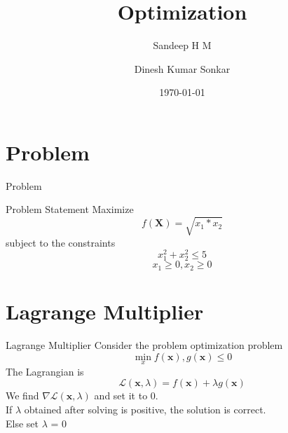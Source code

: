\documentclass{beamer}
\title{Optimization}
\author{Sandeep H M \and Dinesh Kumar Sonkar}
\date{\today}
\begin{document}
\begin{frame}
  \titlepage
\end{frame}

\section{Problem}
\begin{frame}{Problem}
\begin{block}{Problem Statement}
Maximize
\begin{equation*}
    f(\textbf{X}) = \sqrt{x_{1}*x_{2}}
\end{equation*}
subject to the constraints\\
\begin{equation*}
x_{1}^{2} + x_{2}^{2} \leq 5
\end{equation*}
\begin{equation*}
x_{1}\geq 0,x_{2}\geq 0
\end{equation*}
\end{block}

\begin{figure}
\centering
    \qquad
    \label{fig:example}
\end{figure}
\end{frame}

\section{Lagrange Multiplier} 
\begin{frame}{Lagrange Multiplier}
Consider the problem optimization problem
\begin{equation*}
    \min_{x} f(\textbf{x}), g(\textbf{x})\leq 0
\end{equation*}
The Lagrangian is 
\begin{equation*}
   \mathcal{L}(\textbf{x},\lambda) = f(\textbf{x}) + \lambda g(\textbf{x})
\end{equation*}
We find $\nabla \mathcal{L}(\textbf{x},\lambda)$ and set it to 0.\\
If $\lambda$ obtained after solving is positive, the solution is correct.\\
Else set $\lambda$ = 0
\end{frame}
\end{document}

